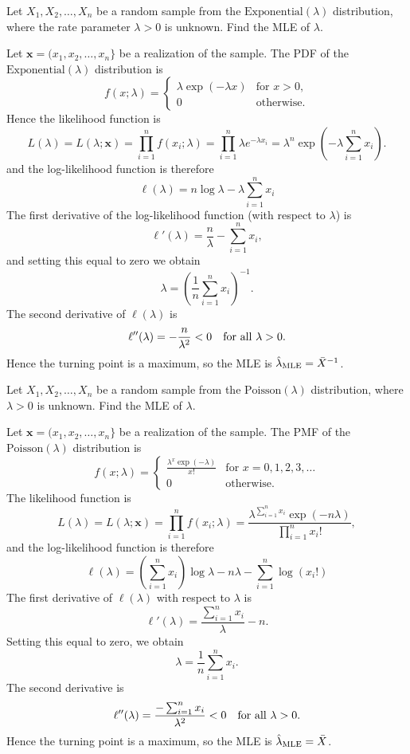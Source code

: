 \begin{exercise}
\begin{questions}

\question %
Let $X_1,X_2,\ldots,X_n$ be a random sample from the $\text{Exponential}(\lambda)$ distribution, where the rate parameter $\lambda>0$ is unknown. Find the MLE of $\lambda$. 
\begin{answer}
Let $\mathbf{x}=(x_1,x_2,\ldots,x_n\}$ be a realization of the sample. The PDF of the $\text{Exponential}(\lambda)$ distribution is
\[
f(x;\lambda) = \left\{\begin{array}{ll} 
	\lambda\exp(-\lambda x) 	& \text{for } x>0, \\
	0						& \text{otherwise}.
\end{array}\right.
\]
Hence the likelihood function is
\[
L(\lambda) = L(\lambda;\mathbf{x}) 
	= \prod_{i=1}^nf(x_i;\lambda)
	= \prod_{i=1}^n\lambda e^{-\lambda x_i} 
	= \lambda^n\exp\left(-\lambda\sum_{i=1}^n x_i\right).
\]
and the log-likelihood function is therefore 
\[
\ell(\lambda) = n\log\lambda - \lambda\sum_{i=1}^nx_i
\]
The first derivative of the log-likelihood function (with respect to $\lambda$) is
\[
\ell'(\lambda) = \frac{n}{\lambda } -\sum_{i=1}^{n}x_{i},
\]
and setting this equal to zero we obtain 
\[
\lambda =\left(\frac{1}{n}\sum_{i=1}^n x_i\right)^{-1}.
\]
The second derivative of $\ell(\lambda)$ is
\[
\ell''(\lambda) = -\frac{n}{\lambda^2} < 0 \text{\quad for all $\lambda > 0$.}
\]
Hence the turning point is a maximum, so the MLE is $\hat{\lambda}_{\text{\scriptsize{MLE}}} = \bar{X}^{-1}$.

\end{answer}

\question %
Let $X_1,X_2,\ldots,X_n$ be a random sample from the $\text{Poisson}(\lambda)$ distribution, where $\lambda>0$ is unknown. Find the MLE of $\lambda$.
\begin{answer}
Let $\mathbf{x}=(x_1,x_2,\ldots,x_n\}$ be a realization of the sample. The PMF of the $\text{Poisson}(\lambda)$ distribution is
\[
f(x;\lambda) = \left\{\begin{array}{ll} 
	\displaystyle\frac{\lambda^x\exp(-\lambda)}{x!} 	& \text{for } x=0,1,2,3,\ldots \\[2ex]
	0									& \text{otherwise}.
\end{array}\right.
\]
The likelihood function is 
\[
L(\lambda) = L(\lambda;\mathbf{x}) 
	= \prod_{i=1}^n f(x_i ;\lambda )
	= \frac{\lambda^{\sum_{i=1}^n x_i}\exp(-n\lambda)}{\prod_{i=1}^n x_i!},
\]
and the log-likelihood function is therefore
\[
\ell(\lambda)= \left(\sum_{i=1}^n x_i\right)\log\lambda - n{\lambda}- \sum_{i=1}^n\log(x_i!)
\]
The first derivative of $\ell(\lambda)$ with respect to $\lambda$ is
\[
\ell'(\lambda) = \frac{\sum_{i=1}^n x_i}{\lambda} - n.
\]
Setting this equal to zero, we obtain 
\[
\lambda = \frac{1}{n}\sum_{i=1}^n x_i.
\]
The second derivative is
\[
\ell''(\lambda) = \frac{-\sum_{i=1}^n x_i}{\lambda ^{2}} < 0 \text{\quad for all $\lambda > 0$.}
\]
Hence the turning point is a maximum, so the MLE is $\hat{\lambda}_{\text{\scriptsize{MLE}}} = \bar{X}$.
\end{answer}


\end{questions}
\end{exercise}
